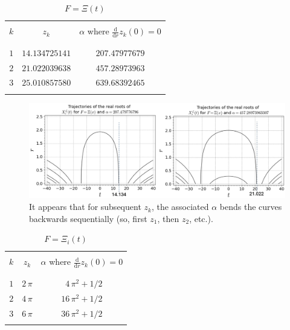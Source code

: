 \documentclass[a4paper,11pt,twoside]{amsart}
\newcommand{\verifiedeq}{=}
\newcommand{\verifiedeq}{\stackrel{\checkmark}{=}}
\begin{document}
\small{
\begin{table}[H]
  \begin{center}
    \caption{$F\verifiedeq\Xi(t)$}
    \label{tab:tablefunc}
    \begin{tabular}{|c|c|c|} 
      \hline
       & &\\
      $k$ & $z_k$ & $\alpha$ where $\frac{\mathrm{d}}{\mathrm{d} r} z_k(0) = 0$ \\
       & \\
      \hline
       & &\\
      $ 1$ & $14.134725141 $ &$207.47977679$ \\ 
      $ 2$ & $21.022039638 $ &$457.28973963$ \\ 
      $ 3$ & $25.010857580 $ &$639.68392465$ \\ 
       & & \\
       \hline
    \end{tabular}
  \end{center}
\end{table}
}

\begin{figure}[H]
  \includegraphics[width=1\linewidth]{LaguerreCurvedXi.jpg}
  \caption{It appears that for subsequent $z_k$, the associated $\alpha$ bends the curves backwards sequentially (so, first $z_1$, then $z_2$, etc.). }
  \label{fig:flowLcurveXi}
\end{figure}


\small{
\begin{table}[H]
  \begin{center}
    \caption{$F\verifiedeq\Xi_i(t)$}
    \label{tab:tablefunc}
    \begin{tabular}{|c|c|c|} 
      \hline
       & &\\
      $k$ & $z_k$ & $\alpha$ where $\frac{\mathrm{d}}{\mathrm{d} r} z_k(0) = 0$ \\
       && \\
      \hline
       & &\\
      $ 1$ & $2\,\pi $ &$\,\,\,4\,\pi^2 + 1/2$ \\ 
      $ 2$ & $4\,\pi $ &$16\,\pi^2 + 1/2$ \\ 
      $ 3$ & $6\,\pi $ &$36\,\pi^2 + 1/2$ \\ 
       & &\\
       \hline
    \end{tabular}
  \end{center}
\end{table}
}
\end{document}
